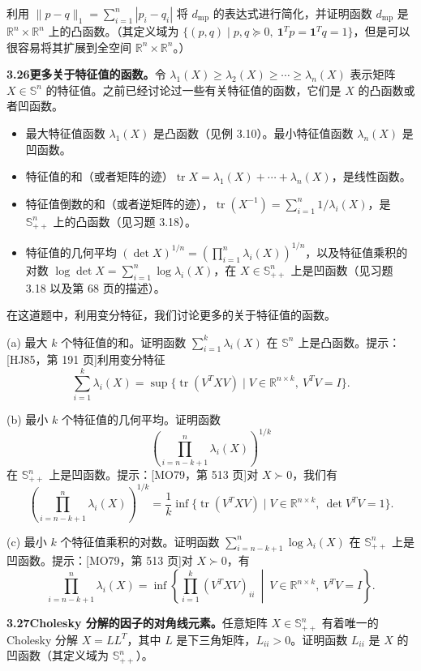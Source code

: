 \documentclass[UTF8,12pt,a4paper,fontset=fandol]{ctexart}
\begin{document}
利用 $\|p-q\|_1=\sum_{i=1}^n |p_i-q_i|$ 将 $d_{\mathrm{mp}}$ 的表达式进行简化，并证明函数 $d_{\mathrm{mp}}$ 是 $\mathbb{R}^n\times\mathbb{R}^n$ 上的凸函数。（其定义域为 $\{(p,q)\mid p,q\succeq0,\ \mathbf{1}^Tp=\mathbf{1}^Tq=1\}$，但是可以很容易将其扩展到全空间 $\mathbb{R}^n\times\mathbb{R}^n$。）

\noindent\textbf{3.26\quad 更多关于特征值的函数。}\quad 令 $\lambda_1(X)\geq\lambda_2(X)\geq\cdots\geq\lambda_n(X)$ 表示矩阵 $X\in\mathbb{S}^n$ 的特征值。之前已经讨论过一些有关特征值的函数，它们是 $X$ 的凸函数或者凹函数。
\begin{itemize}
\item 最大特征值函数 $\lambda_1(X)$ 是凸函数（见例 3.10）。最小特征值函数 $\lambda_n(X)$ 是凹函数。
\item 特征值的和（或者矩阵的迹）$\operatorname{tr}X=\lambda_1(X)+\cdots+\lambda_n(X)$，是线性函数。
\item 特征值倒数的和（或者逆矩阵的迹），$\operatorname{tr}(X^{-1})=\sum_{i=1}^n 1/\lambda_i(X)$，是 $\mathbb{S}_{++}^n$ 上的凸函数（见习题 3.18）。
\item 特征值的几何平均 $(\det X)^{1/n}=\left(\prod_{i=1}^n\lambda_i(X)\right)^{1/n}$，以及特征值乘积的对数 $\log\det X=\sum_{i=1}^n\log\lambda_i(X)$，在 $X\in\mathbb{S}_{++}^n$ 上是凹函数（见习题 3.18 以及第 68 页的描述）。
\end{itemize}

在这道题中，利用变分特征，我们讨论更多的关于特征值的函数。

(a) 最大 $k$ 个特征值的和。证明函数 $\sum_{i=1}^k\lambda_i(X)$ 在 $\mathbb{S}^n$ 上是凸函数。提示：[HJ85，第 191 页]利用变分特征
\[
\sum_{i=1}^k\lambda_i(X)=\sup\{\operatorname{tr}(V^TXV)\mid V\in\mathbb{R}^{n\times k},\ V^TV=I\}.
\]

(b) 最小 $k$ 个特征值的几何平均。证明函数
\[
\left(\prod_{i=n-k+1}^n\lambda_i(X)\right)^{1/k}
\]
在 $\mathbb{S}_{++}^n$ 上是凹函数。提示：[MO79，第 513 页]对 $X\succ0$，我们有
\[
\left(\prod_{i=n-k+1}^n\lambda_i(X)\right)^{1/k}
=\frac{1}{k}\inf\{\operatorname{tr}(V^TXV)\mid V\in\mathbb{R}^{n\times k},\ \det V^TV=1\}.
\]

(c) 最小 $k$ 个特征值乘积的对数。证明函数 $\sum_{i=n-k+1}^n\log\lambda_i(X)$ 在 $\mathbb{S}_{++}^n$ 上是凹函数。提示：[MO79，第 513 页]对 $X\succ0$，有
\[
\prod_{i=n-k+1}^n\lambda_i(X)
=\inf\left\{\prod_{i=1}^k (V^TXV)_{ii}\ \middle|\ V\in\mathbb{R}^{n\times k},\ V^TV=I\right\}.
\]

\noindent\textbf{3.27\quad Cholesky 分解的因子的对角线元素。}\quad 任意矩阵 $X\in\mathbb{S}_{++}^n$ 有着唯一的 Cholesky 分解 $X=LL^T$，其中 $L$ 是下三角矩阵，$L_{ii}>0$。证明函数 $L_{ii}$ 是 $X$ 的凹函数（其定义域为 $\mathbb{S}_{++}^n$）。
\end{document}
